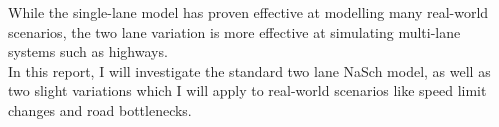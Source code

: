 \documentclass[11pt]{article}
\begin{document}
	While the single-lane model has proven effective at modelling many real-world scenarios, the two lane variation is more effective at simulating multi-lane systems such as highways.\\ 
	
	In this report, I will investigate the standard two lane NaSch model, as well as two slight variations which I will apply to real-world scenarios like speed limit changes and road bottlenecks. 
	
	
	\newpage
	
	
	
	
\end{document}
